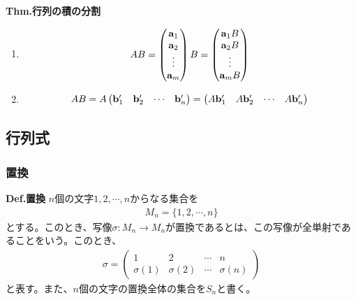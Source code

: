 \documentclass[a4paper,11pt]{jsarticle}
\numberwithin{equation}{section}
\begin{document}
\begin{itembox}[l]{\textbf{Thm.行列の積の分割}}
\begin{enumerate}
\begin{align}
\begin{pmatrix}
    \end{pmatrix}
  \end{align}%
  \item 
  \begin{align}
    AB = \begin{pmatrix}
      \vb{a}_1\\
      \vb{a}_2\\
      \vdots\\
      \vb{a}_m
    \end{pmatrix}
    B
    =
    \begin{pmatrix}
      \vb{a}_1 B\\
      \vb{a}_2 B\\
      \vdots\\
      \vb{a}_m B
    \end{pmatrix}
  \end{align}
  \item
  \begin{align}
    AB = A
    \begin{pmatrix}
      \vb{b}'_1 & \vb{b}'_2 & \cdots & \vb{b}'_n
    \end{pmatrix}
    =
    \begin{pmatrix}
      A \vb{b}'_1 & A \vb{b}'_2 & \cdots & A \vb{b}'_n
    \end{pmatrix}
  \end{align}
  \end{enumerate}
\end{itembox}

\subsection{行列式}
\subsubsection{置換}
\begin{itembox}[l]{\textbf{Def.置換}}
  $n$個の文字$1,2,\cdots,n$からなる集合を
  \begin{align}
    M_n = \{1,2,\cdots,n\}
  \end{align}
  とする。このとき、写像$\sigma:M_n \to M_n$が置換であるとは、この写像が全単射であることをいう。このとき、
  \begin{align}
    \sigma = \begin{pmatrix}
      1 & 2 & \cdots & n\\
      \sigma(1) & \sigma(2) & \cdots & \sigma(n)
    \end{pmatrix}
  \end{align}
  と表す。また、$n$個の文字の置換全体の集合を$S_n$と書く。
\end{itembox}
\end{document}
